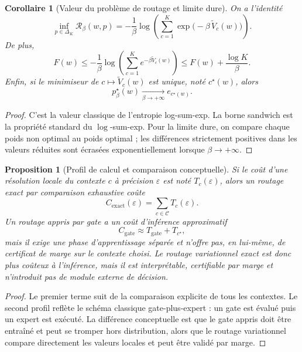 \documentclass[11pt,a4paper]{article}
\newtheorem{proposition}{Proposition}[section]
\newtheorem{corollary}{Corollaire}[section]
\newcommand{\Ccal}{\mathcal C}
\newcommand{\Rcal}{\mathcal R}
\begin{document}
\begin{corollary}[Valeur du problème de routage et limite dure]
On a l'identité
\[
\inf_{p\in\Delta_K}\Rcal_\beta(w,p)
=
-\frac{1}{\beta}\log\!\left(\sum_{c=1}^K \exp\!\bigl(-\beta\,\widetilde V_c(w)\bigr)\right).
\]
De plus,
\[
F(w)\le -\frac{1}{\beta}\log\!\left(\sum_{c=1}^K e^{-\beta \widetilde V_c(w)}\right)\le F(w)+\frac{\log K}{\beta}.
\]
Enfin, si le minimiseur de \(c\mapsto \widetilde V_c(w)\) est unique, noté \(c^\star(w)\), alors
\[
p^\star_\beta(w)\xrightarrow[\beta\to+\infty]{}e_{c^\star(w)}.
\]
\end{corollary}

\begin{proof}
C'est la valeur classique de l'entropie log-sum-exp. La borne sandwich est la propriété standard du \(\log\)-sum-exp. Pour la limite dure, on compare chaque poids non optimal au poids optimal ; les différences strictement positives dans les valeurs réduites sont écrasées exponentiellement lorsque \(\beta\to+\infty\).
\end{proof}

\begin{proposition}[Profil de calcul et comparaison conceptuelle]
Si le coût d'une résolution locale du contexte \(c\) à précision \(\varepsilon\) est noté \(T_c(\varepsilon)\), alors un routage exact par comparaison exhaustive coûte
\[
C_{\mathrm{exact}}(\varepsilon)=\sum_{c\in\Ccal}T_c(\varepsilon).
\]
Un routage appris par gate a un coût d'inférence approximatif
\[
C_{\mathrm{gate}}\approx T_{\mathrm{gate}}+T_{c^\star},
\]
mais il exige une phase d'apprentissage séparée et n'offre pas, en lui-même, de certificat de marge sur le contexte choisi. Le routage variationnel exact est donc plus coûteux à l'inférence, mais il est interprétable, certifiable par marge et n'introduit pas de module externe de décision.
\end{proposition}

\begin{proof}
Le premier terme suit de la comparaison explicite de tous les contextes. Le second profil reflète le schéma classique gate-plus-expert : un gate est évalué puis un expert est exécuté. La différence conceptuelle est que le gate appris doit être entraîné et peut se tromper hors distribution, alors que le routage variationnel compare directement les valeurs locales et peut être validé par marge.
\end{proof}
\end{document}
